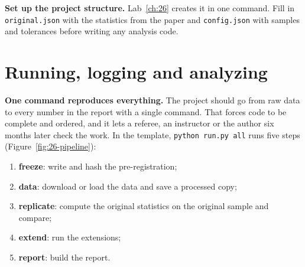 {\sloppy \textbf{Set up the project structure.} Lab~\ref{ch:26} creates it in one command. Fill in \texttt{original.json} with the statistics from the paper and \texttt{config.json} with samples and tolerances before writing any analysis code.\par}

\section{Running, logging and analyzing}
\label{sec:26-running}

\textbf{One command reproduces everything.} The project should go from raw data to every number in the report with a single command. That forces code to be complete and ordered, and it lets a referee, an instructor or the author six months later check the work. In the template, \texttt{python run.py all} runs five steps (Figure~\ref{fig:26-pipeline}):

\begin{enumerate}
  \item \textbf{freeze}: write and hash the pre-registration;
  \item \textbf{data}: download or load the data and save a processed copy;
  \item \textbf{replicate}: compute the original statistics on the original sample and compare;
  \item \textbf{extend}: run the extensions;
  \item \textbf{report}: build the report.
\end{enumerate}

